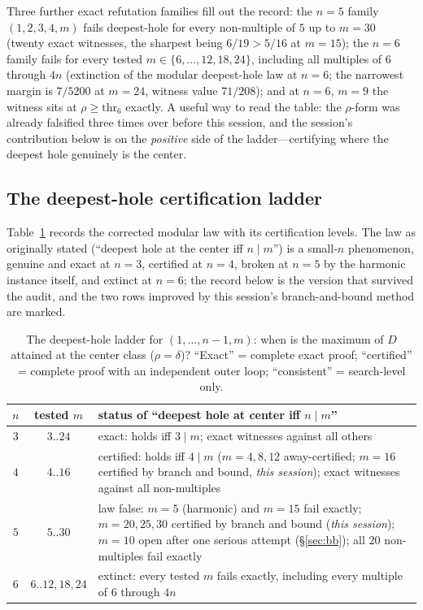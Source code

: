 Three further exact refutation families fill out the record: the $n=5$
family $(1,2,3,4,m)$ fails deepest-hole for every non-multiple of $5$
up to $m=30$ (twenty exact witnesses, the sharpest being $6/19>5/16$ at
$m=15$); the $n=6$ family fails for every tested $m\in\{6,\dots,12,18,
24\}$, including all multiples of $6$ through $4n$ (extinction of the
modular deepest-hole law at $n=6$; the narrowest margin is $7/5200$ at
$m=24$, witness value $71/208$); and at $n=6$, $m=9$ the witness sits at
$\rho\ge\mathrm{thr}_6$ exactly. A useful way to read the table: the
$\rho$-form was already falsified three times over before this session,
and the session's contribution below is on the \emph{positive} side of
the ladder---certifying where the deepest hole genuinely is the center.

\subsection{The deepest-hole certification ladder}

Table~\ref{tab:ladder} records the corrected modular law with its
certification levels. The law as originally stated (``deepest hole at
the center iff $n\mid m$'') is a small-$n$ phenomenon, genuine and exact
at $n=3$, certified at $n=4$, broken at $n=5$ by the harmonic instance
itself, and extinct at $n=6$; the record below is the version that
survived the audit, and the two rows improved by this session's
branch-and-bound method are marked.

\begin{table}[htbp]
\centering
\small
\caption{The deepest-hole ladder for $(1,\dots,n{-}1,m)$: when is the
maximum of $D$ attained at the center class ($\rho=\delta$)?
``Exact'' = complete exact proof; ``certified'' = complete proof with an
independent outer loop; ``consistent'' = search-level only.}
\label{tab:ladder}
\begin{tabularx}{\textwidth}{@{} c c >{\raggedright\arraybackslash}X @{}}
\toprule
$n$ & tested $m$ & status of ``deepest hole at center iff $n\mid m$''
\\
\midrule
$3$ & $3..24$ & exact: holds iff $3\mid m$; exact witnesses against all
others \\
$4$ & $4..16$ & certified: holds iff $4\mid m$ ($m=4,8,12$
away-certified; $m=16$ certified by branch and bound, \emph{this
session}); exact witnesses against all non-multiples \\
$5$ & $5..30$ & law false: $m=5$ (harmonic) and $m=15$ fail exactly;
$m=20,25,30$ certified by branch and bound (\emph{this session});
$m=10$ open after one serious attempt (\S\ref{sec:bb}); all $20$
non-multiples fail exactly \\
$6$ & $6..12,18,24$ & extinct: every tested $m$ fails exactly, including
every multiple of $6$ through $4n$ \\
\bottomrule
\end{tabularx}
\end{table}


